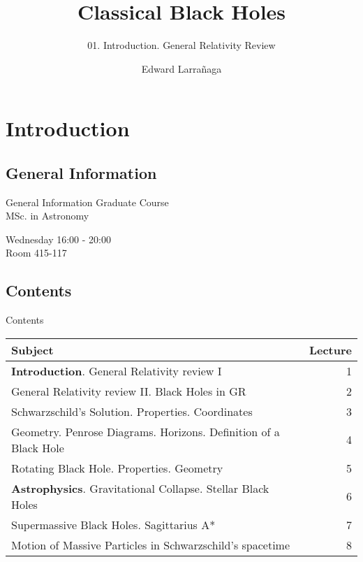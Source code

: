 \documentclass{beamer}
\title{Classical Black Holes} %
\subtitle{01. Introduction. General Relativity Review} %
\author{Edward Larra\~{n}aga}
\begin{document}
  \frame{\maketitle}

    
    
    \section{Introduction}
    
    \subsection{General Information}
    \begin{frame}{General Information}
    	Graduate Course\\ 
        MSc. in Astronomy\\\bigskip
        
      	Wednesday 16:00 - 20:00 \\
      	Room 415-117\\\bigskip
    \end{frame}
	
    \subsection{Contents}
    \begin{frame}{Contents}  
    	\begin{table}[!b]
        {\carlitoTLF %
        \begin{tabularx}{\textwidth}{Xr}
          \textbf{Subject} & \textbf{Lecture} \\
          \toprule
          \textbf{Introduction}. General Relativity review I	& 1\\ 
          General Relativity review II. Black Holes in GR	& 2  \\   
          Schwarzschild's Solution. Properties. Coordinates	& 3  \\    
          Geometry. Penrose Diagrams. Horizons. Definition of a Black Hole	& 4  \\ 
          Rotating Black Hole. Properties. Geometry	& 5   \\    
          \textbf{Astrophysics}. Gravitational Collapse. Stellar Black Holes	& 6  \\    
          Supermassive Black Holes. Sagittarius A*	& 7  \\    
          Motion of Massive Particles in Schwarzschild's spacetime	& 8  \\    
          \bottomrule
        \end{tabularx}}
        
    	\end{table}
	\end{frame}
    
\end{document}
